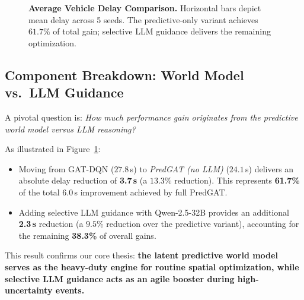 \documentclass[11pt,a4paper]{article}
\begin{document}
\begin{figure}[t]
\centering
{}
\caption{\textbf{Average Vehicle Delay Comparison.} Horizontal bars depict mean delay across 5 seeds. The predictive-only variant achieves $61.7\%$ of total gain; selective LLM guidance delivers the remaining optimization.}
\label{fig:bar_delay}
\end{figure}

\subsection{Component Breakdown: World Model vs.\ LLM Guidance}
A pivotal question is: \textit{How much performance gain originates from the predictive world model versus LLM reasoning?}

As illustrated in Figure~\ref{fig:bar_delay}:
\begin{itemize}
    \item Moving from GAT-DQN ($27.8$\,s) to \textit{PredGAT (no LLM)} ($24.1$\,s) delivers an absolute delay reduction of \textbf{3.7\,s} (a $13.3\%$ reduction). This represents \textbf{61.7\%} of the total $6.0$\,s improvement achieved by full PredGAT.
    \item Adding selective LLM guidance with Qwen-2.5-32B provides an additional \textbf{2.3\,s} reduction (a $9.5\%$ reduction over the predictive variant), accounting for the remaining \textbf{38.3\%} of overall gains.
\end{itemize}
This result confirms our core thesis: \textbf{the latent predictive world model serves as the heavy-duty engine for routine spatial optimization, while selective LLM guidance acts as an agile booster during high-uncertainty events.}
\end{document}
